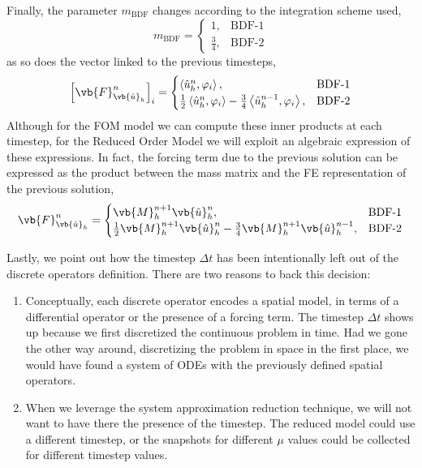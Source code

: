 \documentclass[../../main.tex]{subfiles}
\newcommand{\inner}[2]{\left<#1, #2\right>}
\begin{document}
Finally, the parameter $m_{\text{BDF}}$ changes according to the integration scheme used,
\begin{equation}
    m_{\text{BDF}} = 
    \begin{cases}
    1, &\text{BDF-1} \\    
    \frac{3}{4}, &\text{BDF-2}    
    \end{cases}
\end{equation}
as so does the vector linked to the previous timesteps, 
\begin{equation}
    \left[\vb{F}_{\vb{\hat{u}}_h}^{n}\right]_{i} = 
    \begin{cases}
        \inner{\hat{u}_h^{n}}{\varphi_i}, &\text{BDF-1} \\
        \frac{1}{2}\inner{\hat{u}_h^{n}}{\varphi_i}
        - \frac{3}{4}\inner{\hat{u}_h^{n-1}}{\varphi_i}, &\text{BDF-2}
    \end{cases}
\end{equation}
Although for the FOM model we can compute these inner products at each timestep, for the Reduced Order Model we will exploit an algebraic expression of these expressions.
In fact, the forcing term due to the previous solution can be expressed as the product between the mass matrix and the FE representation of the previous solution, 
\begin{equation}
    \label{eq:1d_fom_forcing_term_time_mass_matrix}
    \vb{F}_{\vb{\hat{u}}_h}^{n}= 
    \begin{cases}
        \vb{M}_{h}^{n+1} \vb{\hat{u}}_{h}^{n}, &\text{BDF-1} \\
        \frac{1}{2}\vb{M}_{h}^{n+1} \vb{\hat{u}}_{h}^{n}
        - \frac{3}{4}\vb{M}_{h}^{n+1} \vb{\hat{u}}_{h}^{n-1}, &\text{BDF-2}
    \end{cases}
\end{equation}

Lastly, we point out how the timestep $\Delta t$ has been intentionally left out of the discrete operators definition.
There are two reasons to back this decision:
\begin{enumerate}
    \item Conceptually, each discrete operator encodes a spatial model, in terms of a differential operator or the presence of a forcing term.
    The timestep $\Delta t$ shows up because we first discretized the continuous problem in time. 
    Had we gone the other way around, discretizing the problem in space in the first place, we would have found a system of ODEs with the previously defined spatial operators. 
    \item When we leverage the system approximation reduction technique, we will not want to have there the presence of the timestep.
    The reduced model could use a different timestep, or the snapshots for different $\mu$ values could be collected for different timestep values.
\end{enumerate} 
\end{document}
